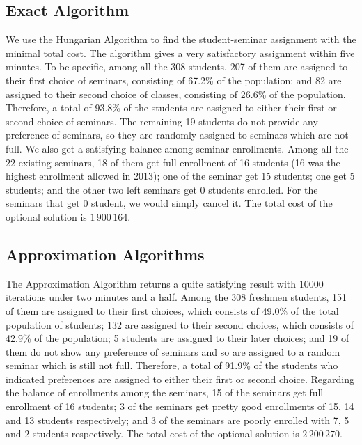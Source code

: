 \documentclass{article} %
\begin{document}
\subsection{Exact Algorithm}
\par\qquad We use the Hungarian Algorithm to find the student-seminar assignment with the minimal total cost. The algorithm gives a very satisfactory assignment within five minutes. To be specific, among all the 308 students, 207 of them are assigned to their first choice of seminars, consisting of 67.2\% of the population; and 82 are assigned to their second choice of classes, consisting of 26.6\% of the population. Therefore, a total of 93.8\% of the students are assigned to either their first or second choice of seminars. The remaining 19 students do not provide any preference of seminars, so they are randomly assigned to seminars which are not full. We also get a satisfying balance among seminar enrollments. Among all the 22 existing seminars, 18 of them get full enrollment of 16 students (16 was the highest enrollment allowed in 2013); one of the seminar get 15 students; one get 5 students; and the other two left seminars get 0 students enrolled. For the seminars that get 0 student, we would simply cancel it. The total cost of the optional solution is $1\,900\,164$.

\subsection{Approximation Algorithms}
\par\qquad The Approximation Algorithm returns a quite satisfying result with 10000 iterations under two minutes and a half. Among the 308 freshmen students, 151 of them are assigned to their first choices, which consists of 49.0\% of the total population of students; 132 are assigned to their second choices, which consists of 42.9\% of the population; 5 students are assigned to their later choices; and 19 of them do not show any preference of seminars and so are assigned to a random seminar which is still not full. Therefore, a total of 91.9\% of the students who indicated preferences are assigned to either their first or second choice. Regarding the balance of enrollments among the seminars, 15 of the seminars get full enrollment of 16 students; 3 of the seminars get pretty good enrollments of 15, 14 and 13 students respectively; and 3 of the seminars are poorly enrolled with 7, 5 and 2 students respectively. The total cost of the optional solution is $2\,200\,270$.
\end{document}
